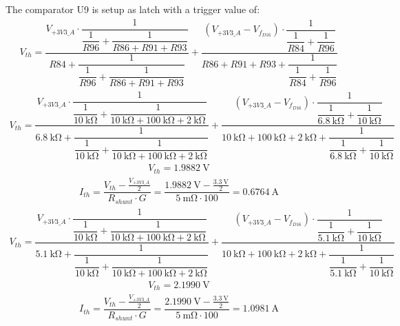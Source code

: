 The comparator U9 is setup as latch with a trigger value of: 
\begin{align}
V_{th} 
    = \dfrac{V_{+3V3\_A} \cdot \dfrac{1}{\dfrac{1}{R96} + \dfrac{1}{R86 + R91 + R93}}}{R84 + \dfrac{1}{\dfrac{1}{R96} + \dfrac{1}{R86 + R91 + R93}}} 
    + \dfrac{\left(V_{+3V3\_A} - V_{f_{D16}}\right) \cdot \dfrac{1}{\dfrac{1}{R84} + \dfrac{1}{R96}}}{R86 + R91 + R93 + \dfrac{1}{\dfrac{1}{R84} + \dfrac{1}{R96}}}
\end{align}
\begin{align}
V_{th} 
    = \dfrac{V_{+3V3\_A} \cdot \dfrac{1}{\dfrac{1}{\qty{10}{\kilo\ohm}} + \dfrac{1}{\qty{10}{\kilo\ohm} + \qty{100}{\kilo\ohm} + \qty{2}{\kilo\ohm}}}}{\qty{6.8}{\kilo\ohm} + \dfrac{1}{\dfrac{1}{\qty{10}{\kilo\ohm}} + \dfrac{1}{\qty{10}{\kilo\ohm} + \qty{100}{\kilo\ohm} + \qty{2}{\kilo\ohm}}}} 
    + \dfrac{\left(V_{+3V3\_A} - V_{f_{D16}}\right) \cdot \dfrac{1}{\dfrac{1}{\qty{6.8}{\kilo\ohm}} + \dfrac{1}{\qty{10}{\kilo\ohm}}}}{\qty{10}{\kilo\ohm} + \qty{100}{\kilo\ohm} + \qty{2}{\kilo\ohm} + \dfrac{1}{\dfrac{1}{\qty{6.8}{\kilo\ohm}} + \dfrac{1}{\qty{10}{\kilo\ohm}}}}
\end{align}
\begin{align}
V_{th} = \qty{1.9882}{\volt}
\end{align}
\begin{align}
I_{th} = \dfrac{V_{th} - \frac{V_{+3V3\_A}}{2}}{R_{shunt} \cdot G}
    = \dfrac{\qty{1.9882}{\volt} - \frac{\qty{3.3}{\volt}}{2}}{\qty{5}{\milli\ohm} \cdot 100}
    = \qty{0.6764}{\ampere}
\end{align}
\begin{align}
V_{th} 
    = \dfrac{V_{+3V3\_A} \cdot \dfrac{1}{\dfrac{1}{\qty{10}{\kilo\ohm}} + \dfrac{1}{\qty{10}{\kilo\ohm} + \qty{100}{\kilo\ohm} + \qty{2}{\kilo\ohm}}}}{\qty{5.1}{\kilo\ohm} + \dfrac{1}{\dfrac{1}{\qty{10}{\kilo\ohm}} + \dfrac{1}{\qty{10}{\kilo\ohm} + \qty{100}{\kilo\ohm} + \qty{2}{\kilo\ohm}}}} 
    + \dfrac{\left(V_{+3V3\_A} - V_{f_{D16}}\right) \cdot \dfrac{1}{\dfrac{1}{\qty{5.1}{\kilo\ohm}} + \dfrac{1}{\qty{10}{\kilo\ohm}}}}{\qty{10}{\kilo\ohm} + \qty{100}{\kilo\ohm} + \qty{2}{\kilo\ohm} + \dfrac{1}{\dfrac{1}{\qty{5.1}{\kilo\ohm}} + \dfrac{1}{\qty{10}{\kilo\ohm}}}}
\end{align}
\begin{align}
V_{th} = \qty{2.1990}{\volt}
\end{align}
\begin{align}
I_{th} = \dfrac{V_{th} - \frac{V_{+3V3\_A}}{2}}{R_{shunt} \cdot G}
    = \dfrac{\qty{2.1990}{\volt} - \frac{\qty{3.3}{\volt}}{2}}{\qty{5}{\milli\ohm} \cdot 100}
    = \qty{1.0981}{\ampere}
\end{align}

